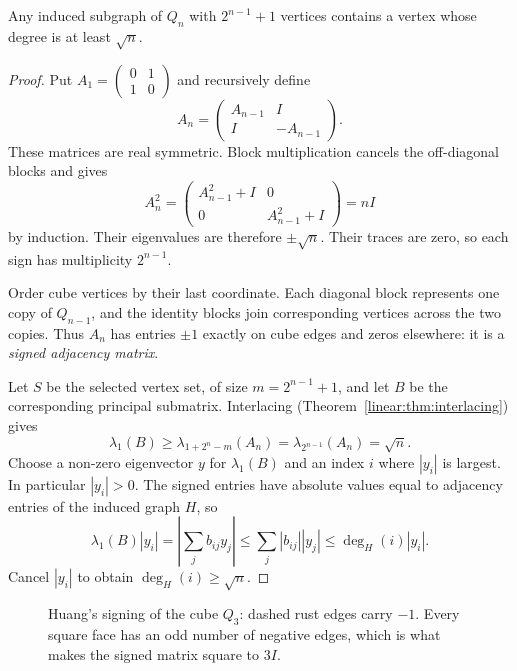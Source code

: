 \begin{theorem}[Huang, 2019]\label{linear:thm:huang}
Any induced subgraph of $Q_n$ with $2^{n-1}+1$ vertices contains a vertex whose degree is at least $\sqrt n$.
\end{theorem}
\begin{proof}
Put $A_1=\begin{pmatrix}0&1\\1&0\end{pmatrix}$ and recursively define
\[
A_n=\begin{pmatrix}A_{n-1}&I\\I&-A_{n-1}\end{pmatrix}.
\]
These matrices are real symmetric. Block multiplication cancels the off-diagonal blocks and gives
\[
A_n^2=\begin{pmatrix}A_{n-1}^2+I&0\\0&A_{n-1}^2+I\end{pmatrix}=nI
\]
by induction. Their eigenvalues are therefore $\pm\sqrt n$. Their traces are zero, so each sign has multiplicity $2^{n-1}$.

Order cube vertices by their last coordinate. Each diagonal block represents one copy of $Q_{n-1}$, and the identity blocks join corresponding vertices across the two copies. Thus $A_n$ has entries $\pm1$ exactly on cube edges and zeros elsewhere: it is a \emph{signed adjacency matrix}.

Let $S$ be the selected vertex set, of size $m=2^{n-1}+1$, and let $B$ be the corresponding principal submatrix. Interlacing (Theorem~\ref{linear:thm:interlacing}) gives
\[
\lambda_1(B)\ge\lambda_{1+2^n-m}(A_n)
=\lambda_{2^{n-1}}(A_n)=\sqrt n.
\]
Choose a non-zero eigenvector $y$ for $\lambda_1(B)$ and an index $i$ where $|y_i|$ is largest. In particular $|y_i|>0$. The signed entries have absolute values equal to adjacency entries of the induced graph $H$, so
\[
\lambda_1(B)|y_i|=\left|\sum_jb_{ij}y_j\right|
\le\sum_j|b_{ij}||y_j|\le\deg_H(i)|y_i|.
\]
Cancel $|y_i|$ to obtain $\deg_H(i)\ge\sqrt n$.
\end{proof}

\begin{figure}[ht]
\centering
{}
\caption{Huang's signing of the cube $Q_3$: dashed rust edges carry $-1$. Every square face has an odd number of negative edges,
which is what makes the signed matrix square to $3I$.}
\label{linear:fig:huang}
\end{figure}

